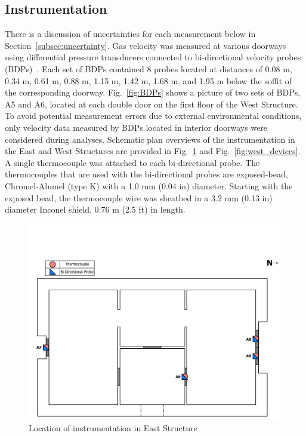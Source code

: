 \documentclass[12pt,oneside]{book}
\begin{document}
\subsection{Instrumentation}
\label{subsec:instrumentation}
There is a discussion of uncertainties for each measurement below in Section~\ref{subsec:uncertainty}. Gas velocity was measured at various doorways using differential pressure transducers connected to bi-directional velocity probes (BDPs)~\cite{McCaffrey:Combustion_and_Flame}. Each set of BDPs contained 8 probes located at distances of 0.08 m, 0.34 m, 0.61 m, 0.88 m, 1.15 m, 1.42 m, 1.68 m, and 1.95 m below the soffit of the corresponding doorway. Fig.~\ref{fig:BDPs} shows a picture of two sets of BDPs, A5 and A6, located at each double door on the first floor of the West Structure. To avoid potential measurement errors due to external environmental conditions, only velocity data measured by BDPs located in interior doorways were considered during analyses. Schematic plan overviews of the instrumentation in the East and West Structures are provided in Fig.~\ref{fig:east_devices} and Fig.~\ref{fig:west_devices}. A single thermocouple was attached to each bi-directional probe. The thermocouples that are used with the bi-directional probes are exposed-bead, Chromel-Alumel (type K) with a 1.0 mm (0.04 in) diameter. Starting with the exposed bead, the thermocouple wire was sheathed in a 3.2 mm (0.13 in) diameter Inconel shield, 0.76 m (2.5 ft) in length.

\begin{figure}[!ht]
\includegraphics[trim=0cm 0cm 0.25cm 3.75cm, clip=true, width=6in]{../Drawings/Instrumentation/East_Structure_Devices_Hose_Test}
\caption[Location of Instrumentation in East Structure]{Location of instrumentation in East Structure}
\label{fig:east_devices}
\end{figure}
\end{document}
